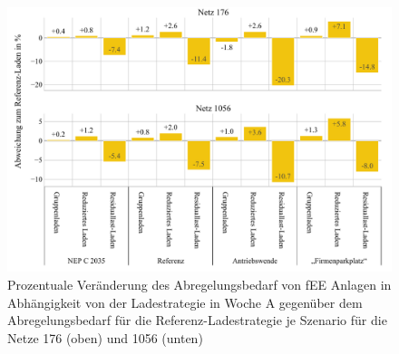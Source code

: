\begin{figure}[H]
    \centering
    \includegraphics[width=\textwidth]{Bilder/176_1056_cur_fee_grid_week_A}
    \caption{Prozentuale Veränderung des Abregelungsbedarf von fEE Anlagen in Abhängigkeit von der Ladestrategie in Woche A gegenüber dem Abregelungsbedarf für die Referenz-Ladestrategie je Szenario für die Netze \num{176} (oben) und \num{1056} (unten)}\label{fig:176_1056_cur_fee_grid_week_A}
\end{figure}